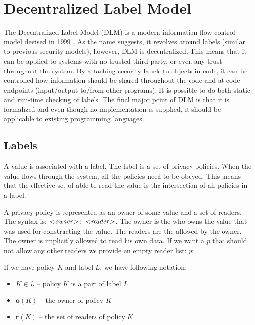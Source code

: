 
\newcommand{\policy}[2]{\ensuremath{#1\!:\;#2}}

\section{Decentralized Label Model}
The Decentralized Label Model (DLM) is a modern information flow control model devised in 1999 \cite{myers1999mostly}.
As the name suggests, it revolves around labels (similar to previous security models), however, DLM is decentralized.
This means that it can be applied to systems with no trusted third party, or even any trust throughout the system.
By attaching security labels to objects in code, it can be controlled how information should be shared throughout the code and at code-endpoints (input/output to/from other programs).
It is possible to do both static and run-time checking of labels.
The final major point of DLM is that it is formalized and even though no implementation is supplied, it should be applicable to existing programming languages.

\newcommand{\xvalue}{value}
\newcommand{\xvalues}{values}

\subsection{Labels}
A \xvalue{} is associated with a label.
The label is a set of privacy policies.
When the \xvalue{} flows through the system, all the policies need to be obeyed.
This means that the effective set of \principals{} able to read the \xvalue{} is the intersection of all policies in a label.

A privacy policy is represented as an owner of some \xvalue{} and a set of readers.
The syntax is: $\policy{\text{<\emph{owner}>}}{\text{<\emph{reader}>}}$.
The owner is the \principal{} who owns the \xvalue{} that was used for constructing the \xvalue{}.
The readers are the \principals{} allowed by the owner.
The owner is implicitly allowed to read his own data.
If we want a \principal{} $p$ that should not allow any other readers we provide an empty reader list: $\policy{p}{}$.

If we have policy $K$ and label $L$, we have following notation:
\begin{itemize}
\item $K \in L$ -- policy $K$ is a part of label $L$
\item $\textbf{o}(K)$ -- the owner of policy $K$
\item $\textbf{r}(K)$ -- the set of readers of policy $K$
\end{itemize}


